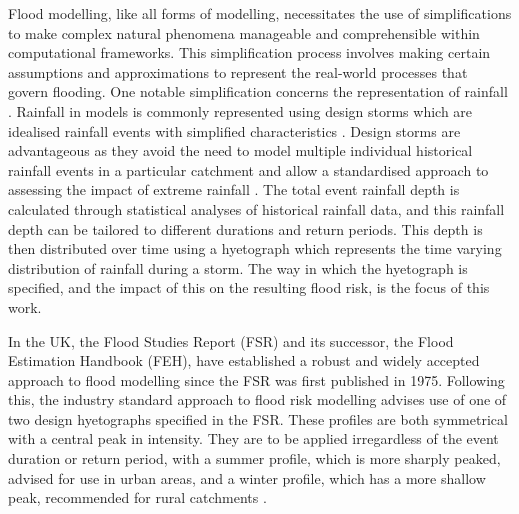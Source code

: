 \documentclass[APA,Times2COL]{WileyNJDv5}
\begin{document}
Flood modelling, like all forms of modelling, necessitates the use of simplifications to make complex natural phenomena manageable and comprehensible within computational frameworks. This simplification process involves making certain assumptions and approximations to represent the real-world processes that govern flooding. One notable simplification concerns the representation of rainfall \citep{bardossy2022precipitation}. Rainfall in models is commonly represented using design storms which are idealised rainfall events with simplified characteristics \citep{butler_urban_2004}. Design storms are advantageous as they avoid the need to model multiple individual historical rainfall events in a particular catchment and allow a standardised approach to assessing the impact of extreme rainfall \citep{balbastre2019comparison, marsalek1984design}. The total event rainfall depth is calculated through statistical analyses of historical rainfall data, and this rainfall depth can be tailored to different durations and return periods. This depth is then distributed over time using a hyetograph which represents the time varying distribution of rainfall during a storm. The way in which the hyetograph is specified, and the impact of this on the resulting flood risk, is the focus of this work.

In the UK, the Flood Studies Report (FSR) and its successor, the Flood Estimation Handbook (FEH), have established a robust and widely accepted approach to flood modelling since the FSR was first published in 1975. Following this, the industry standard approach to flood risk modelling advises use of one of two design hyetographs specified in the FSR. These profiles are both symmetrical with a central peak in intensity. They are to be applied irregardless of the event duration or return period, with a summer profile, which is more sharply peaked, advised for use in urban areas, and a winter profile, which has a more shallow peak, recommended for rural catchments \citep{faulkner1999}. 
\end{document}
